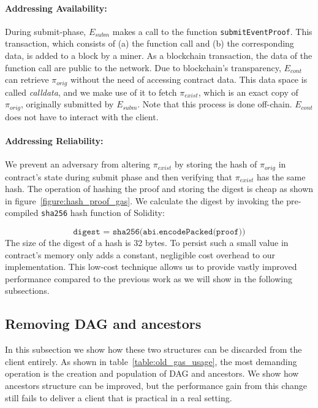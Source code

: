 
\paragraph{Addressing Availability:}

During submit-phase, $E_{subm}$ makes a call to the function
\texttt{submitEventProof}. This transaction, which consists of (a) the function
call and (b) the corresponding data, is added to a block by a miner. As a
blockchain transaction, the data of the function call are public to the
network. Due to blockchain's transparency, $E_{cont}$ can retrieve
$\pi_{orig}$ without the need of accessing contract data. This data space is
called \emph{calldata}, and we make use of it to fetch $\pi_{exist}$, which is
an exact copy of $\pi_{orig}$, originally submitted by $E_{subm}$. Note that
this process is done off-chain. $E_{cont}$ does not have to interact with the
client.

\paragraph{Addressing Reliability:}

We prevent an adversary from altering $\pi_{exist}$ by storing the hash of
$\pi_{orig}$ in contract's state during submit phase and then verifying that
$\pi_{exist}$ has the same hash. The operation of hashing the proof and storing
the digest is cheap as shown in figure~\ref{figure:hash_proof_gas}. We
calculate the digest by invoking the pre-compiled \texttt{sha256} hash function
of Solidity:

\[\texttt{digest = sha256(abi.encodePacked(proof))}\] The size of the digest of
a hash is 32 bytes. To persist such a small value in contract's memory only
adds a constant, negligible cost overhead to our implementation. This low-cost
technique allows us to provide vastly improved performance compared to the
previous work as we will show in the following subsections.





\subsection{Removing DAG and ancestors}

In this subsection we show how these two structures can be discarded from the
client entirely. As shown in table~\ref{table:old_gas_usage}, the most
demanding operation is the creation and population of DAG and ancestors. We
show how ancestors structure can be improved, but the performance gain from
this change still fails to deliver a client that is practical in a real
setting.

